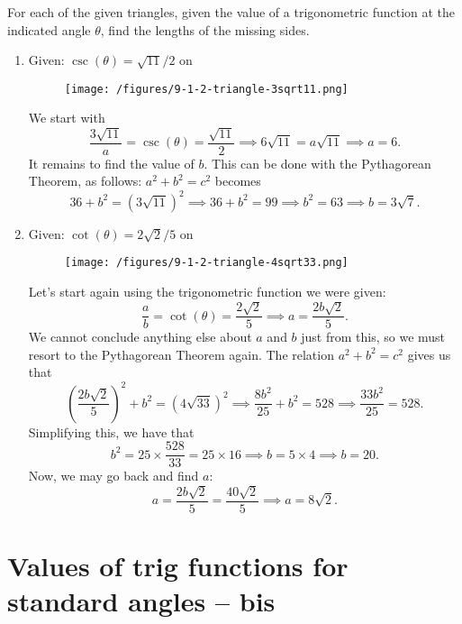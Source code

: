 \documentclass{ximera}
\begin{document}
\begin{example}
  For each of the given triangles, given the value of a trigonometric function at the indicated angle $\theta$, find the lengths of the missing sides.
  \begin{enumerate}[label=\alph*.]
  \item Given: $\csc(\theta) = \sqrt{11}/2$ on
    \begin{figure}[h]
      \centering
      \texttt{[image: /figures/9-1-2-triangle-3sqrt11.png]}
    \end{figure}
    
    \begin{explanation}
      We start with $$\frac{3\sqrt{11}}{a} = \csc(\theta) = \frac{\sqrt{11}}{2} \implies 6\sqrt{11} = a\sqrt{11} \implies a = 6.$$It remains to find the value of $b$. This can be done with the Pythagorean Theorem, as follows: $a^2+b^2=c^2$ becomes  $$36 + b^2 = (3\sqrt{11})^2 \implies 36+b^2 = 99 \implies b^2= 63 \implies b = 3\sqrt{7}.$$
    \end{explanation}
  \item Given: $\cot(\theta) = 2\sqrt{2}/5$ on     \begin{figure}[h]
      \centering
      \texttt{[image: /figures/9-1-2-triangle-4sqrt33.png]}
    \end{figure}

    
    \begin{explanation}
      Let's start again using the trigonometric function we were given: $$\frac{a}{b} = \cot(\theta) = \frac{2\sqrt{2}}{5} \implies a= \frac{2b\sqrt{2}}{5}.$$We cannot conclude anything else about $a$ and $b$ just from this, so we must resort to the Pythagorean Theorem again. The relation $a^2+b^2=c^2$ gives us that $$\left(\frac{2b\sqrt{2}}{5}\right)^2+b^2 = (4\sqrt{33})^2 \implies \frac{8b^2}{25}+b^2 = 528 \implies \frac{33b^2}{25} = 528.$$Simplifying this, we have that $$b^2 = 25\times \frac{528}{33} = 25\times 16 \implies b = 5\times 4 \implies b=20.$$Now, we may go back and find $a$: $$a = \frac{2b\sqrt{2}}{5}= \frac{40\sqrt{2}}{5} \implies a = 8\sqrt{2}.$$
    \end{explanation}
  \end{enumerate}
\end{example}


\section{Values of trig functions for standard angles -- bis}
\end{document}
